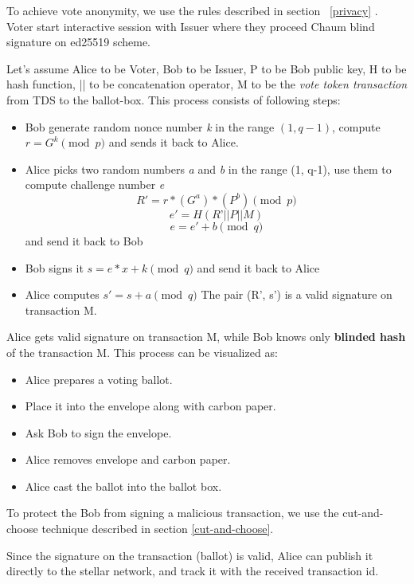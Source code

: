 \documentclass[runningheads]{llncs}
\begin{document}
To achieve vote anonymity, we use the rules described in section ~\ref{privacy} . Voter start interactive session with Issuer where they proceed Chaum blind signature \cite{blindsignatureschaum} on ed25519 scheme. 

Let's assume Alice to be Voter, Bob to be Issuer, P to be Bob public key, H to be hash function, || to be concatenation operator, M to be the \textit{vote token transaction} from TDS to the ballot-box.
This process consists of following steps:
\begin{itemize}
\item Bob generate random nonce number \textit{k} in the range $(1, q-1)$, compute 
\(r = G^k \pmod{p}\)
and sends it back to Alice.
\item Alice picks two random numbers \textit{a} and \textit{b} in the range (1, q-1), use them to compute challenge number \textit{e}
\[R' = r*(G^a)*(P^b) \pmod{p}\]
\[e' = H(R’|| P || M)\]
\[e = e' + b \pmod{q}\]
and send it back to Bob
\item Bob signs it 
\(s = e*x + k \pmod{q}\)
and send it back to Alice
\item Alice computes 
$s' = s + a \pmod{q}$
The pair (R', s') is a valid signature on transaction M.
\end{itemize}
Alice gets valid signature on transaction M, while Bob knows only \textbf{blinded hash} of the transaction M.
This process can be visualized as:
\begin{itemize}
    \item Alice prepares a voting ballot.
    \item Place it into the envelope along with carbon paper.
    \item Ask Bob to sign the envelope.
    \item Alice removes envelope and carbon paper.
    \item Alice cast the ballot into the ballot box.
\end{itemize}

To protect the Bob from signing a malicious transaction, we use the cut-and-choose technique described in section \ref{cut-and-choose}.

Since the signature on the transaction (ballot) is valid, Alice can publish it directly to the stellar network, and track it with the received transaction id. 
\end{document}

